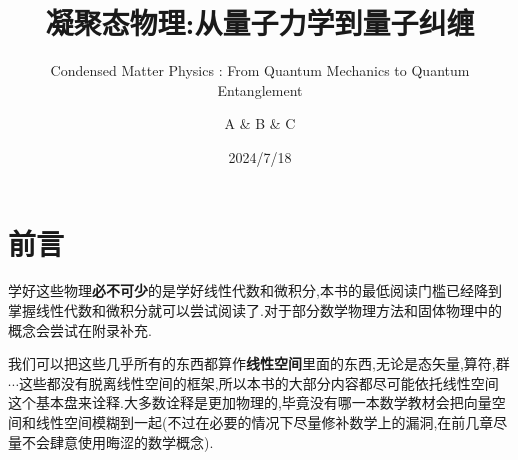 \documentclass[lang=cn,newtx,10pt,scheme=chinese,thmcnt=section]{elegantbook}
\title{凝聚态物理:从量子力学到量子纠缠}
\subtitle{Condensed Matter Physics : From Quantum Mechanics to Quantum Entanglement}
\author{A \& B \& C}
\institute{Group 530}
\date{2024/7/18}
\begin{document}
\maketitle
\frontmatter

\tableofcontents

\mainmatter











\chapter*{前言}
学好这些物理\textbf{必不可少}的是学好线性代数和微积分,本书的最低阅读门槛已经降到掌握线性代数和微积分就可以尝试阅读了.对于部分数学物理方法和固体物理中的概念会尝试在附录补充.

我们可以把这些几乎所有的东西都算作\textbf{线性空间}里面的东西,无论是态矢量,算符,群$\cdots$这些都没有脱离线性空间的框架,所以本书的大部分内容都尽可能依托线性空间这个基本盘来诠释.大多数诠释是更加物理的,毕竟没有哪一本数学教材会把向量空间和线性空间模糊到一起(不过在必要的情况下尽量修补数学上的漏洞,在前几章尽量不会肆意使用晦涩的数学概念).
\end{document}
